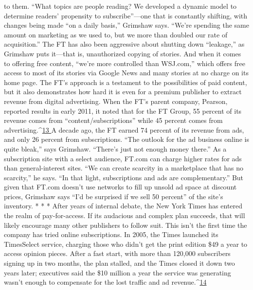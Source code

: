 to them. ``What topics are people reading? We developed a dynamic model
to determine readers’ propensity to subscribe''—one that is constantly shifting,
with changes being made ``on a daily basis,'' Grimshaw says. ``We’re spending the
same amount on marketing as we used to, but we more than doubled our rate
of acquisition.''
The FT has also been aggressive about shutting down ``leakage,'' as Grimshaw
puts it—that is, unauthorized copying of stories. And when it comes to offering
free content, ``we’re more controlled than WSJ.com,'' which offers free access to
most of its stories via Google News and many stories at no charge on its home
page.
The FT’s approach is a testament to the possibilities of paid content, but it also
demonstrates how hard it is even for a premium publisher to extract revenue
from digital advertising. When the FT’s parent company, Pearson, reported results
in early 2011, it noted that for the FT Group, 55 percent of its revenue comes
from ``content/subscriptions'' while 45 percent comes from advertising.^{\href{#endnotes-ch5}{13 }}A decade
ago, the FT earned 74 percent of its revenue from ads, and only 26 percent
from subscriptions.
``The outlook for the ad business online is quite bleak,'' says Grimshaw. ``There’s
just not enough money there.'' As a subscription site with a select audience,
FT.com can charge higher rates for ads than general-interest sites. ``We can create
scarcity in a marketplace that has no scarcity,'' he says. ``In that light, subscriptions
and ads are complementary.'' But given that FT.com doesn’t use networks to fill
up unsold ad space at discount prices, Grimshaw says ``I’d be surprised if we sell
50 percent'' of the site’s inventory.
* * *
After years of internal debate, the New York Times has entered the realm of
pay-for-access. If its audacious and complex plan succeeds, that will likely encourage
many other publishers to follow suit.
This isn’t the first time the company has tried online subscriptions. In 2005,
the Times launched its TimesSelect service, charging those who didn’t get the
print edition \$49 a year to access opinion pieces. After a fast start, with more than
120,000 subscribers signing up in two months, the plan stalled, and the Times
closed it down two years later; executives said the \$10 million a year the service
was generating wasn’t enough to compensate for the lost traffic and ad revenue.^{\href{#endnotes-ch5}{14}}%
